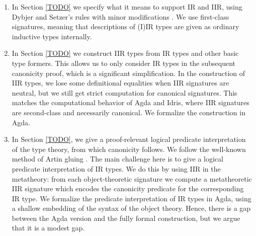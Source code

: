 \documentclass[acmsmall,screen,review,anonymous]{acmart}
\begin{document}


\begin{enumerate}
\item In Section \ref{TODO} we specify what it means to support IR and IIR, using Dybjer and
  Setzer's rules with minor modifications \cite{TODO}. We use first-class signatures,
  meaning that descriptions of (I)IR types are given as ordinary inductive types internally.
\item In Section \ref{TODO} we construct IIR types from IR types and other basic type formers. This
  allows us to only consider IR types in the subsequent canonicity proof, which is a significant
  simplification. In the construction of IIR types, we lose some definitional equalities when IIR
  signatures are neutral, but we still get strict computation for canonical signatures. This matches
  the computational behavior of Agda and Idris, where IIR signatures are second-class and
  necessarily canonical. We formalize the construction in Agda.
\item In Section \ref{TODO}, we give a proof-relevant logical predicate interpretation of the type
  theory, from which canonicity follows. We follow the well-known method of Artin gluing
  \cite{TODO}. The main challenge here is to give a logical predicate interpretation of IR types. We
  do this by using IIR in the metatheory: from each object-theoretic signature we compute a
  metatheoretic IIR signature which encodes the canonicity predicate for the corresponding IR type.
  We formalize the predicate interpretation of IR types in Agda, using a shallow embedding of the
  syntax of the object theory. Hence, there is a gap between the Agda version and the fully formal
  construction, but we argue that it is a modest gap.

\end{enumerate}
\end{document}
